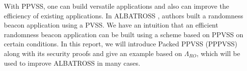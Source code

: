 With PPVSS, one can build versatile applications and also can improve the efficiency of existing 
applications. In ALBATROSS \cite{cryptoeprint:2020/644}, authors built a randomness beacon application 
using a PVSS. We have an intuition that an efficient randomness beacon application can be built 
using a scheme based on PPVSS on certain conditions. In this report, we will introduce Packed PPVSS (PPPVSS) 
along with its security proofs and give an example based on $\Lambda_{RO}$, which will be used to improve 
ALBATROSS in many cases.\par


